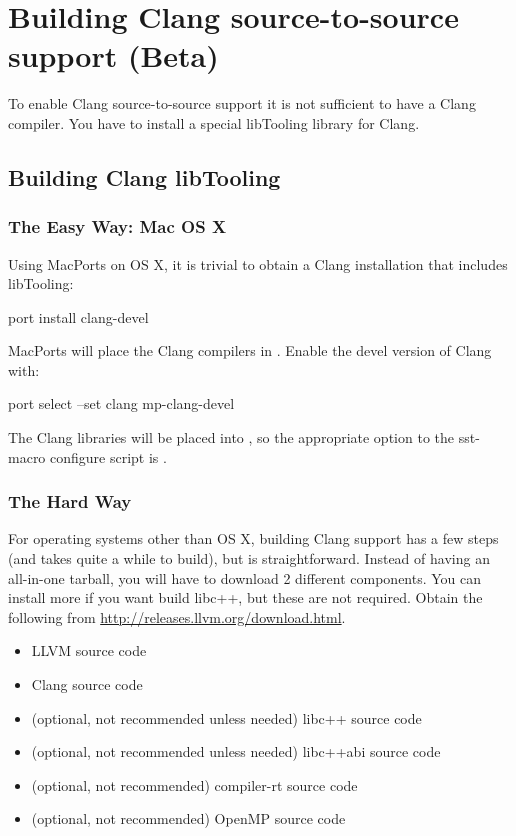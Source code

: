 \section{Building Clang source-to-source support (Beta)}
\label{sec:buildingClang}

To enable Clang source-to-source support it is not sufficient to have a Clang compiler.  You have to install a special libTooling library for Clang.

\subsection{Building Clang libTooling}
\label{subsec:buildingClanglibTooling}

\subsubsection{The Easy Way: Mac OS X}
\label{subsubsec:libToolingOSX}
Using MacPorts on OS X, it is trivial to obtain a Clang installation that includes libTooling:

\begin{ViFile}
port install clang-devel
\end{ViFile}

MacPorts will place the Clang compilers in .  Enable the devel version of Clang with:

\begin{ViFile}
port select --set clang mp-clang-devel
\end{ViFile}

The Clang libraries will be placed into , so the appropriate option to the sst-macro configure script is .

\subsubsection{The Hard Way}
\label{subsubsec:libTooling}
For operating systems other than OS X, building Clang support has a few steps (and takes quite a while to build), but is straightforward.
Instead of having an all-in-one tarball, you will have to download 2 different components. You can install more if you want build libc++, but these are not required.
Obtain the following from \url{http://releases.llvm.org/download.html}.

\begin{itemize}
\item LLVM source code
\item Clang source code
\item (optional, not recommended unless needed) libc++ source code
\item (optional, not recommended unless needed) libc++abi source code
\item (optional, not recommended) compiler-rt source code
\item (optional, not recommended) OpenMP source code
\end{itemize}

